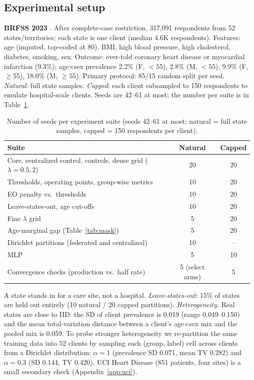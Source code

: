 \documentclass[conference]{IEEEtran}
\begin{document}
\subsection{Experimental setup}
\label{sec:setup}
\textbf{BRFSS 2023} \cite{brfss2023}. After complete-case restriction, 317,091 respondents from 52 states/territories; each state is one client (median 4.6K respondents). Features: age (imputed, top-coded at 80), BMI, high blood pressure, high cholesterol, diabetes, smoking, sex. Outcome: ever-told coronary heart disease or myocardial infarction (9.3\%); age$\times$sex prevalence 2.2\% (F, $<55$), 2.8\% (M, $<55$), 9.9\% (F, $\ge55$), 18.0\% (M, $\ge55$). Primary protocol: 85/15 random split per seed. \emph{Natural}: full state samples. \emph{Capped}: each client subsampled to 150 respondents to emulate hospital-scale clients. Seeds are 42--61 at most; the number per suite is in Table~\ref{tab:seeds}.

\begin{table}[t]
\centering
\caption{Number of seeds per experiment suite (seeds 42--61 at most; natural = full state samples, capped = 150 respondents per client).}
\label{tab:seeds}
\scriptsize
\setlength{\tabcolsep}{3pt}
\begin{tabular}{lcc}
\toprule
Suite & Natural & Capped\\
\midrule
Core, centralized control, controls, dense grid ($\lambda{=}0.5,2$) & 20 & 20\\
Thresholds, operating points, group-wise metrics & 10 & 20\\
EO penalty vs.\ thresholds & 10 & 20\\
Leave-states-out, age cut-offs & 10 & 20\\
Fine $\lambda$ grid & 5 & 20\\
Age-marginal gap (Table~\ref{tab:mask}) & 5 & 20\\
Dirichlet partitions (federated and centralized) & 10 & --\\
MLP & 5 & 10\\
Convergence checks (production vs.\ half rate) & 5 (select arms) & 5\\
\bottomrule
\end{tabular}
\end{table}
 A state stands in for a care site, not a hospital. \emph{Leave-states-out}: 15\% of states are held out entirely (10 natural / 20 capped partitions). \emph{Heterogeneity.} Real states are close to IID: the SD of client prevalence is 0.019 (range 0.049--0.150) and the mean total-variation distance between a client's age$\times$sex mix and the pooled mix is 0.059. To probe stronger heterogeneity we re-partition the same training data into 52 clients by sampling each (group, label) cell across clients from a Dirichlet distribution: $\alpha{=}1$ (prevalence SD 0.071, mean TV 0.282) and $\alpha{=}0.3$ (SD 0.144, TV 0.420). UCI Heart Disease \cite{detrano1989} (851 patients, four sites) is a small secondary check (Appendix~\ref{app:uci}).
\end{document}
